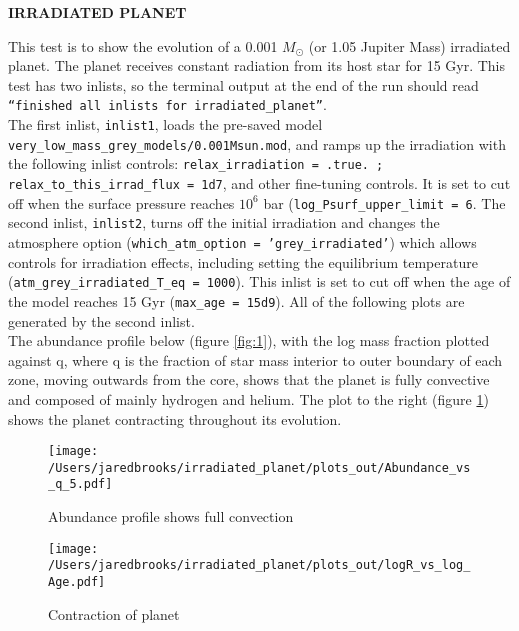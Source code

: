 \documentclass{article}
\begin{document}
	
	\begin{center}
		\begin{Large}
		       \textbf{IRRADIATED PLANET}\\
		\end{Large}
	\end{center}

        This test is to show the evolution of a 0.001 $M_\odot$ (or 1.05 Jupiter Mass) irradiated planet.  The planet receives constant radiation from its host star for 15 Gyr.  This test has two inlists, so the terminal output at the end of the run should read \texttt{``finished all inlists for irradiated\_planet''}.\\

        The first inlist, \texttt{inlist1}, loads the pre-saved model \texttt{very\_low\_mass\_grey\_models/0.001Msun.mod}, and ramps up the  irradiation with the following inlist controls: \texttt{relax\_irradiation = .true. ; relax\_to\_this\_irrad\_flux = 1d7}, and other fine-tuning controls.  It is set to cut off when the surface pressure reaches $10^6$ bar (\texttt{log\_Psurf\_upper\_limit = 6}.  The second inlist, \texttt{inlist2}, turns off the initial irradiation and changes the atmosphere option (\texttt{which\_atm\_option = 'grey\_irradiated'}) which allows controls for irradiation effects, including setting the equilibrium temperature (\texttt{atm\_grey\_irradiated\_T\_eq = 1000}).  This inlist is set to cut off when the age of the model reaches 15 Gyr (\texttt{max\_age = 15d9}).  All of the following plots are generated by the second inlist.\\

        The abundance profile below (figure \ref{fig:1}), with the log mass fraction plotted against q, where q is the fraction of star mass interior to outer boundary of each zone, moving outwards from the core, shows that the planet is fully convective and composed of mainly hydrogen and helium.  The plot to the right (figure \ref{fig:2}) shows the planet contracting throughout its evolution.

	\begin{figure}[H]
                \begin{minipage}[b]{0.5\linewidth}
		       \centering
		       \texttt{[image: /Users/jaredbrooks/irradiated\_planet/plots\_out/Abundance\_vs\_q\_5.pdf]}
		       \caption{Abundance profile shows full convection}
		       \label{fig:1}
                \end{minipage}
                \hspace{0cm}
                \begin{minipage}[b]{0.5\linewidth}
                       \centering
                       \texttt{[image: /Users/jaredbrooks/irradiated\_planet/plots\_out/logR\_vs\_log\_Age.pdf]}
                       \caption{Contraction of planet}
                       \label{fig:2}
                \end{minipage}
	\end{figure}
\end{document}

